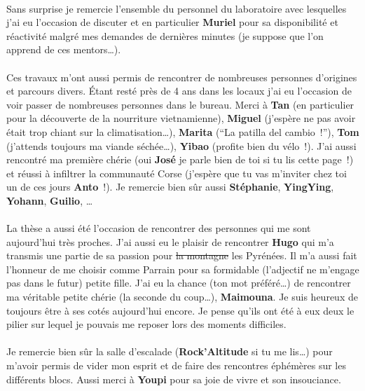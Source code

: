 \paragraph{} %
Sans surprise je remercie l’ensemble du personnel du laboratoire avec lesquelles j’ai
eu l’occasion de discuter et en particulier \textbf{Muriel} pour sa disponibilité et
réactivité malgré mes demandes de dernières minutes (je suppose que l’on apprend de
ces mentors\dots).

\paragraph{} %
Ces travaux m’ont aussi permis de rencontrer de nombreuses personnes d’origines et
parcours divers. Étant resté près de \num{4} ans dans les locaux j’ai eu l’occasion
de voir passer de nombreuses personnes dans le bureau. Merci à \textbf{Tan} (en particulier pour
la découverte de la nourriture vietnamienne), \textbf{Miguel} (j’espère
ne pas avoir était trop chiant sur la climatisation\dots), \textbf{Marita} (\enquote{La patilla del cambio~!}),
\textbf{Tom} (j’attends toujours ma viande séchée\dots), \textbf{Yibao} (profite bien du vélo~!). J’ai aussi rencontré
ma première chérie (oui \textbf{José} je parle bien de toi si tu lis cette page~!) et réussi
à infiltrer la communauté Corse (j’espère que tu vas m’inviter chez toi un de ces jours
\textbf{Anto}~!). Je remercie bien sûr aussi \textbf{Stéphanie}, \textbf{YingYing},
\textbf{Yohann}, \textbf{Guilio}, \dots

\paragraph{} %
La thèse a aussi été l’occasion de rencontrer des personnes qui me sont aujourd’hui très proches.
J’ai aussi eu le plaisir de rencontrer \textbf{Hugo} qui m’a transmis une partie
de sa passion pour \st{la montagne} les Pyrénées. Il m’a aussi fait l’honneur
de me choisir comme Parrain pour sa formidable (l’adjectif ne m’engage pas dans le futur)
petite fille.
J’ai eu la chance (ton mot préféré\dots) de rencontrer ma véritable petite chérie (la seconde
du coup\dots), \textbf{Maimouna}. Je suis heureux de toujours être à ses cotés aujourd’hui encore.
Je pense qu’ils ont été à eux deux le pilier sur lequel je pouvais me reposer lors
des moments difficiles.

\paragraph{} %
Je remercie bien sûr la salle d’escalade (\textbf{Rock’Altitude} si tu me lis\dots) pour
m’avoir permis de vider mon esprit et de faire des rencontres éphémères sur les différents
blocs. Aussi merci à \textbf{Youpi} pour sa joie de vivre et son insouciance.

